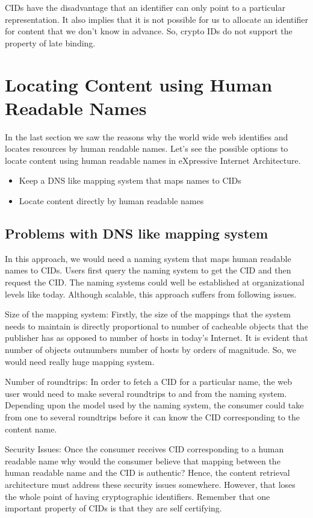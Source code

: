 CIDs have the disadvantage that an identifier can only point to a
particular representation. It also implies that it is not possible for
us to allocate an identifier for content that we don’t know in
advance. So, crypto IDs do not support the property of late binding.

\section{Locating Content using Human Readable Names}

In the last section we saw the reasons why the world wide web
identifies and locates resources by human readable names. Let’s see
the possible options to locate content using human readable names in
eXpressive Internet Architecture.

\begin{itemize}
\item Keep a DNS like mapping system that maps names to CIDs
\item Locate content directly by human readable names
\end{itemize}

\subsection{Problems with DNS like mapping system}

In this approach, we would need a naming system that maps human
readable names to CIDs. Users first query the naming system to get the
CID and then request the CID. The naming systems could well be
established at organizational levels like today. Although scalable,
this approach suffers from following issues.

Size of the mapping system: Firstly, the size of the mappings that the
system needs to maintain is directly proportional to number of
cacheable objects that the publisher has as opposed to number of hosts
in today’s Internet. It is evident that number of objects outnumbers
number of hosts by orders of magnitude. So, we would need really huge
mapping system.

Number of roundtrips: In order to fetch a CID for a particular name,
the web user would need to make several roundtrips to and from the
naming system. Depending upon the model used by the naming system, the
consumer could take from one to several roundtrips before it can know
the CID corresponding to the content name.

Security Issues: Once the consumer receives CID corresponding to a
human readable name why would the consumer believe that mapping
between the human readable name and the CID is authentic? Hence, the
content retrieval architecture must address these security issues
somewhere. However, that loses the whole point of having cryptographic
identifiers. Remember that one important property of CIDs is that they
are self certifying.

